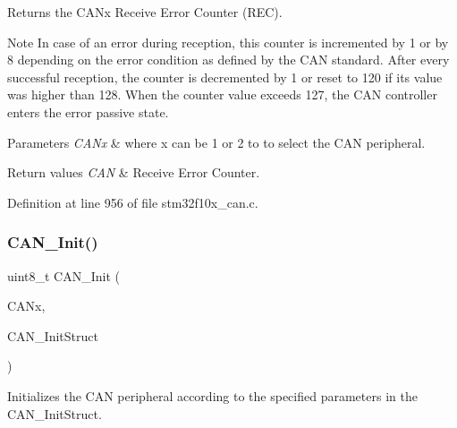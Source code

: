 Returns the C\+A\+Nx Receive Error Counter (R\+EC). 

\begin{DoxyNote}{Note}
In case of an error during reception, this counter is incremented by 1 or by 8 depending on the error condition as defined by the C\+AN standard. After every successful reception, the counter is decremented by 1 or reset to 120 if its value was higher than 128. When the counter value exceeds 127, the C\+AN controller enters the error passive state. 
\end{DoxyNote}

\begin{DoxyParams}{Parameters}
{\em C\+A\+Nx} & where x can be 1 or 2 to to select the C\+AN peripheral. \\
\hline
\end{DoxyParams}

\begin{DoxyRetVals}{Return values}
{\em C\+AN} & Receive Error Counter. \\
\hline
\end{DoxyRetVals}


Definition at line 956 of file stm32f10x\+\_\+can.\+c.

\mbox{\label{group___c_a_n___exported___functions_ga9023c35a9ab931ad4513fc5d19b4bd6c}} 
\subsubsection{\texorpdfstring{C\+A\+N\+\_\+\+Init()}{CAN\_Init()}}
{\footnotesize\ttfamily uint8\+\_\+t C\+A\+N\+\_\+\+Init (\begin{DoxyParamCaption}\item[{\hyperlink{struct_c_a_n___type_def}{C\+A\+N\+\_\+\+Type\+Def} $\ast$}]{C\+A\+Nx,  }\item[{\hyperlink{struct_c_a_n___init_type_def}{C\+A\+N\+\_\+\+Init\+Type\+Def} $\ast$}]{C\+A\+N\+\_\+\+Init\+Struct }\end{DoxyParamCaption})}



Initializes the C\+AN peripheral according to the specified parameters in the C\+A\+N\+\_\+\+Init\+Struct. 


